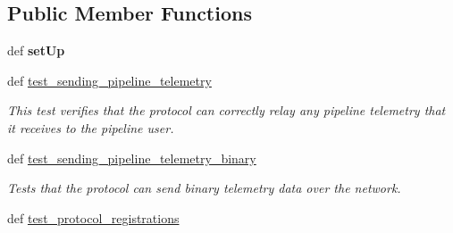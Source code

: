 \subsection*{Public Member Functions}
\begin{DoxyCompactItemize}
\item 
\hypertarget{classhwm_1_1network_1_1protocols_1_1tests_1_1test__telemetry__protocol_1_1_test_pipeline_telemetry_protocol_a73e9a44de9a0fff958802c4994ae8998}{def {\bfseries set\-Up}}\label{classhwm_1_1network_1_1protocols_1_1tests_1_1test__telemetry__protocol_1_1_test_pipeline_telemetry_protocol_a73e9a44de9a0fff958802c4994ae8998}

\item 
def \hyperlink{classhwm_1_1network_1_1protocols_1_1tests_1_1test__telemetry__protocol_1_1_test_pipeline_telemetry_protocol_ab284817aa396aa8588de82343569a141}{test\-\_\-sending\-\_\-pipeline\-\_\-telemetry}
\begin{DoxyCompactList}\small\item\em This test verifies that the protocol can correctly relay any pipeline telemetry that it receives to the pipeline user. \end{DoxyCompactList}\item 
def \hyperlink{classhwm_1_1network_1_1protocols_1_1tests_1_1test__telemetry__protocol_1_1_test_pipeline_telemetry_protocol_a26ea2216647e717a77c80bedb56b0e08}{test\-\_\-sending\-\_\-pipeline\-\_\-telemetry\-\_\-binary}
\begin{DoxyCompactList}\small\item\em Tests that the protocol can send binary telemetry data over the network. \end{DoxyCompactList}\item 
\hypertarget{classhwm_1_1network_1_1protocols_1_1tests_1_1test__telemetry__protocol_1_1_test_pipeline_telemetry_protocol_a1c2a982e6b8d756ea8128908b76318b7}{def \hyperlink{classhwm_1_1network_1_1protocols_1_1tests_1_1test__telemetry__protocol_1_1_test_pipeline_telemetry_protocol_a1c2a982e6b8d756ea8128908b76318b7}{test\-\_\-protocol\-\_\-registrations}}\label{classhwm_1_1network_1_1protocols_1_1tests_1_1test__telemetry__protocol_1_1_test_pipeline_telemetry_protocol_a1c2a982e6b8d756ea8128908b76318b7}


\end{DoxyCompactItemize}
